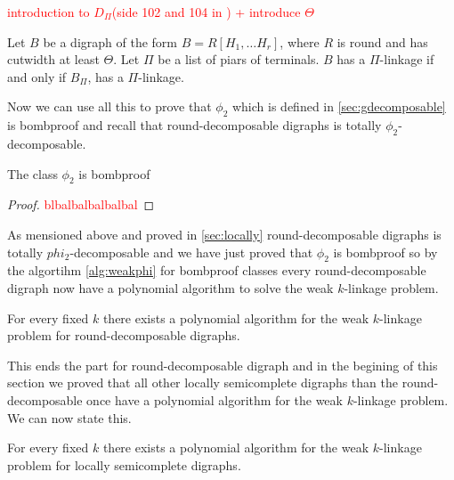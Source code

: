 \textcolor{red}{introduction to $D_{\Pi}$(side 102 and 104 in \cite{bangJGT77}) + introduce $\Theta$}
\begin{lemma}
    Let $B$ be a digraph of the form $B=R[H_1,\dots H_r]$, where $R$ is round and has cutwidth at least $\Theta$. Let $\Pi$ be a list of piars of terminals. $B$ has a $\Pi$-linkage if and only if $B_\Pi$, has a $\Pi$-linkage.
\end{lemma}
Now we can use all this to prove that $\phi_2$ which is defined in \autoref{sec:gdecomposable} is bombproof and recall that round-decomposable digraphs is totally $\phi_2$-decomposable.
\begin{lemma}
    The class $\phi_2$ is bombproof
\end{lemma}
\begin{proof}
    \textcolor{red}{blbalbalbalbalbal}
\end{proof}
As mensioned above and proved in \autoref{sec:locally} round-decomposable digraphs is totally $phi_2$-decomposable and we have just proved that $\phi_2$ is bombproof so by the algortihm \autoref{alg:weakphi} for bombproof classes every round-decomposable digraph now have a polynomial algorithm to solve the weak $k$-linkage problem.
\begin{thm}
    For every fixed $k$ there exists a polynomial algorithm for the weak $k$-linkage problem for round-decomposable digraphs.
\end{thm}
This ends the part for round-decomposable digraph and in the begining of this section we proved that all other locally semicomplete digraphs than the round-decomposable once have a polynomial algorithm for the weak $k$-linkage problem. We can now state this.
\begin{thm}
    For every fixed $k$ there exists a polynomial algorithm for the weak $k$-linkage problem for locally semicomplete digraphs.
\end{thm}